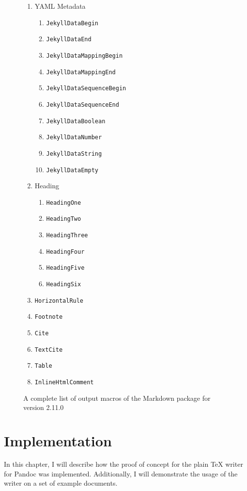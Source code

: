 \documentclass[
  digital,     %
  oneside,     %
  nosansbold,  %
  nocolorbold, %
  lof,         %
  lot,         %
]{fithesis4}
\begin{document}
\begin{figure}
\begin{multicols}{2}
\begin{enumerate}
      \item YAML Metadata
      \begin{enumerate}  %
        \item \texttt{JekyllDataBegin}
        \item \texttt{JekyllDataEnd}
        \item \texttt{JekyllDataMappingBegin}
        \item \texttt{JekyllDataMappingEnd}
        \item \texttt{JekyllDataSequenceBegin}
        \item \texttt{JekyllDataSequenceEnd}
        \item \texttt{JekyllDataBoolean}
        \item \texttt{JekyllDataNumber}
        \item \texttt{JekyllDataString}
        \item \texttt{JekyllDataEmpty}
      \end{enumerate}
      \item Heading
      \begin{enumerate}
        \item \texttt{HeadingOne}
        \item \texttt{HeadingTwo}
        \item \texttt{HeadingThree}
        \item \texttt{HeadingFour}
        \item \texttt{HeadingFive}
        \item \texttt{HeadingSix}
      \end{enumerate}
      \item \texttt{HorizontalRule}
      \item \texttt{Footnote}
      \item \texttt{Cite}
      \item \texttt{TextCite}
      \item \texttt{Table}
      \item \texttt{InlineHtmlComment}
    \end{enumerate}
  \end{multicols}
  \vspace*{-1em}
  \caption{A complete list of output macros of the Markdown package for version 2.11.0}
  \label{fig:markdown-renderers}
\end{figure}

\chapter{Implementation}
In this chapter, I will describe how the proof of concept for the plain \TeX{} writer for Pandoc was implemented. Additionally, I will demonstrate the usage of the writer on a set of example documents.
\end{document}
